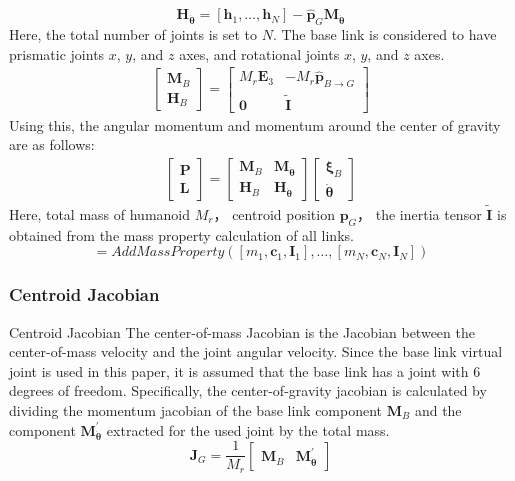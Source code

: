 \begin{equation}
\bm{H}_{\dot{\bm{\theta}}}
=
[\bm{h}_1, \hdots, \bm{h}_{N}]
-
\hat{\bm{p}}_{G} \bm{M}_{\dot{\bm{\theta}}}
\end{equation}
Here, the total number of joints is set to $N$.
The base link is considered to have prismatic joints $x$, $y$, and $z$ axes, and rotational joints $x$, $y$, and $z$ axes.
\begin{eqnarray}
\left[
\begin{array}{c}
\bm{M}_{B}\\
\bm{H}_{B}
\end{array}
\right]
=
\left[
\begin{array}{cc}
M_{r} \bm{E}_3 & - M_{r} \hat{\bm{p}}_{B\to G}\\
\bm{0} & \tilde{\bm{I}}
\end{array}
\right]
\end{eqnarray}
Using this, the angular momentum and momentum around the center of gravity are as follows:
\begin{eqnarray}
\left[
\begin{array}{c}
\bm{P}\\
\bm{L}
\end{array}
\right]
=
\left[
\begin{array}{cc}
\bm{M}_{B} & \bm{M}_{\dot{\bm{\theta}}}\\
\bm{H}_{B} & \bm{H}_{\dot{\bm{\theta}}}
\end{array}
\right]
\left[
\begin{array}{c}
\bm{\xi}_{B}\\
\dot{\bm{\theta}}
\end{array}
\right]
\end{eqnarray}
Here,
total mass of humanoid $M_{r}$，
centroid position $\bm{p}_{G}$，
the inertia tensor $\tilde{\bm{I}}$ is
obtained from the mass property calculation of all links.
\begin{equation}
[M_{r}, \bm{p}_{G}, \tilde{\bm{I}}]
= AddMassProperty(
[m_{1}, \bm{c}_{1}, \bm{I}_{1}]
,\hdots,
[m_{N}, \bm{c}_{N}, \bm{I}_{N}]
)
\end{equation}

\subsubsection{Centroid Jacobian}
Centroid Jacobian%
The center-of-mass Jacobian is the Jacobian between the center-of-mass velocity and the joint angular velocity.
Since the base link virtual joint is used in this paper, it is assumed that the base link has a joint with 6 degrees of freedom. Specifically, the center-of-gravity jacobian is calculated by dividing the momentum jacobian of the base link component $\bm{M}_{B}$ and the component $\bm{M}_{\dot{\bm{\theta}}}^{\prime}$ extracted for the used joint by the total mass.
\begin{equation}
\bm{J}_{G} = 
\frac{1}{M_{r}}
\left[
\begin{array}{cc}
\bm{M}_{B} & \bm{M}_{\dot{\bm{\theta}}}^{\prime}
\end{array}
\right]
\end{equation}


